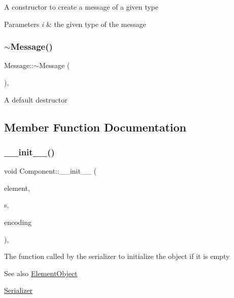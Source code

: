 A constructor to create a message of a given type


\begin{DoxyParams}{Parameters}
{\em i} & the given type of the message \\
\hline
\end{DoxyParams}
\mbox{\label{classMessage_aefaeef0caed942ae0920bea838065b0a}} 
\subsubsection{\texorpdfstring{$\sim$\+Message()}{~Message()}}
{\footnotesize\ttfamily Message\+::$\sim$\+Message (\begin{DoxyParamCaption}{ }\end{DoxyParamCaption})\hspace{0.3cm}{\ttfamily [override]}, {\ttfamily [default]}}

A default destructor 

\subsection{Member Function Documentation}
\mbox{\label{classComponent_a28212595f8ee85fe009bd233bc99b2fc}} 
\subsubsection{\texorpdfstring{\+\_\+\+\_\+init\+\_\+\+\_\+()}{\_\_init\_\_()}}
{\footnotesize\ttfamily void Component\+::\+\_\+\+\_\+init\+\_\+\+\_\+ (\begin{DoxyParamCaption}\item[{\mbox{\hyperlink{classElementObject}{Element\+Object}} $\ast$}]{element,  }\item[{const \mbox{\hyperlink{classSerializer}{Serializer}} $\ast$}]{s,  }\item[{const char $\ast$}]{encoding }\end{DoxyParamCaption})\hspace{0.3cm}{\ttfamily [inline]}, {\ttfamily [inherited]}}

The function called by the serializer to initialize the object if it is empty \begin{DoxySeeAlso}{See also}
\mbox{\hyperlink{classElementObject}{Element\+Object}} 

\mbox{\hyperlink{classSerializer}{Serializer}}
\end{DoxySeeAlso}

